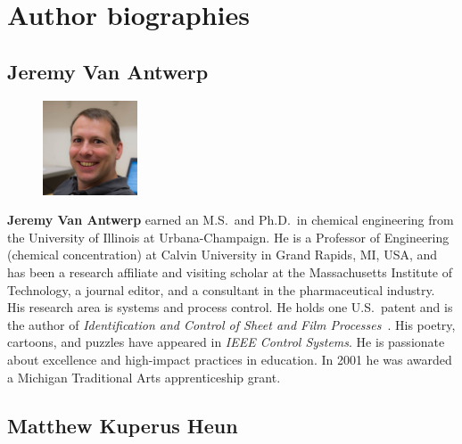 

\chapter*{Author biographies}


\section*{Jeremy Van Antwerp}

\setlength{\intextsep}{-7pt}%
\setlength{\columnsep}{8pt}%
\begin{figure}
  \begin{center}
    \includegraphics[width=0.25\textwidth]{headshots/jva-headshot.jpeg}
  \end{center}
\end{figure}
\textbf{Jeremy Van Antwerp} earned an M.S.\ and Ph.D.\ in chemical engineering 
from the University of Illinois at Urbana-Champaign. 
He is a Professor of Engineering (chemical concentration)
at Calvin University in Grand Rapids, MI, USA,
and has been a research affiliate and visiting scholar at the Massachusetts 
Institute of Technology, a journal editor, and a consultant in the pharmaceutical 
industry.
His research area is systems and process control.
He holds one U.S.\ patent and is the author of \emph{Identification and Control of 
Sheet and Film Processes}~\cite{FeaVB2000}.
His poetry, cartoons, and puzzles have appeared in \emph{IEEE Control Systems}.
He is passionate about excellence and high-impact practices in education.
In 2001 he was awarded a Michigan Traditional Arts apprenticeship grant.


\section*{Matthew Kuperus Heun}

